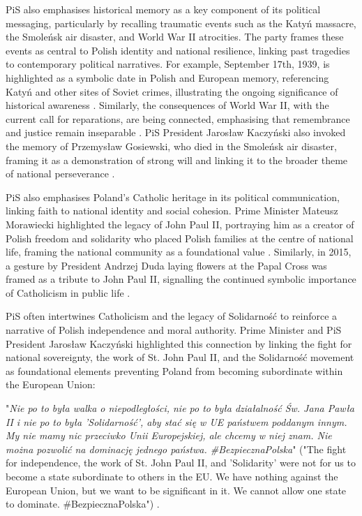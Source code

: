 PiS also emphasises historical memory as a key component of its political messaging, particularly by recalling traumatic events such as the Katyń massacre, the Smoleńsk air disaster, and World War II atrocities. The party frames these events as central to Polish identity and national resilience, linking past tragedies to contemporary political narratives. For example, September 17th, 1939, is highlighted as a symbolic date in Polish and European memory, referencing Katyń and other sites of Soviet crimes, illustrating the ongoing significance of historical awareness \citep{pisorgpl2023j}. Similarly, the consequences of World War II, with the current call for reparations, are being connected, emphasising that remembrance and justice remain inseparable \citep{pisorgpl2023k}. PiS President Jarosław Kaczyński also invoked the memory of Przemysław Gosiewski, who died in the Smoleńsk air disaster, framing it as a demonstration of strong will and linking it to the broader theme of national perseverance \citep{pisorgpl2023l}.

PiS also emphasises Poland's Catholic heritage in its political communication, linking faith to national identity and social cohesion. Prime Minister Mateusz Morawiecki highlighted the legacy of John Paul II, portraying him as a creator of Polish freedom and solidarity who placed Polish families at the centre of national life, framing the national community as a foundational value \citep{pisorgpl2023m}. Similarly, in 2015, a gesture by President Andrzej Duda laying flowers at the Papal Cross was framed as a tribute to John Paul II, signalling the continued symbolic importance of Catholicism in public life \citep{jbrudzinski2015}.

PiS often intertwines Catholicism and the legacy of Solidarność to reinforce a narrative of Polish independence and moral authority. Prime Minister and PiS President Jarosław Kaczyński highlighted this connection by linking the fight for national sovereignty, the work of St. John Paul II, and the Solidarność movement as foundational elements preventing Poland from becoming subordinate within the European Union:

\begin{displayquote}
    "\textit{Nie po to była walka o niepodległości, nie po to była działalność Św. Jana Pawła II i nie po to była 'Solidarność', aby stać się w UE państwem poddanym innym. My nie mamy nic przeciwko Unii Europejskiej, ale chcemy w niej znam. Nie można pozwolić na dominację jednego państwa. \#BezpiecznaPolska}" ("The fight for independence, the work of St. John Paul II, and 'Solidarity' were not for us to become a state subordinate to others in the EU. We have nothing against the European Union, but we want to be significant in it. We cannot allow one state to dominate. \#BezpiecznaPolska") \citep{pisorgpl2023n}.
\end{displayquote}

